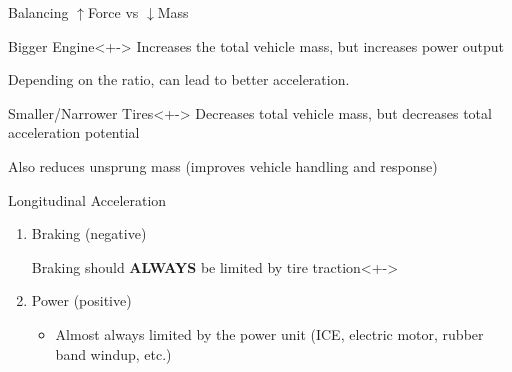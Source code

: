 \documentclass[aspectratio=169]{beamer}
\begin{document}
\begin{frame}{Balancing \(\uparrow\)Force vs \(\downarrow\)Mass}
    \onslide<+->{}
    \begin{exampleblock}{Bigger Engine}<+->
        Increases the total vehicle mass, but increases power output

        Depending on the ratio, can lead to better acceleration.
    \end{exampleblock}

    \vspace{10pt}
    \begin{exampleblock}{Smaller/Narrower Tires}<+->
        Decreases total vehicle mass, but decreases total acceleration potential

        Also reduces unsprung mass (improves vehicle handling and response)
    \end{exampleblock}
\end{frame}

\begin{frame}{Longitudinal Acceleration}

    \begin{enumerate}
        \item<+-> Braking (negative)
            \begin{alertblock}{Braking should \textbf{ALWAYS} be limited by tire traction}<+->
                \begin{itemize}
                \end{itemize}
            \end{alertblock}
        \item<+-> Power (positive)
        \begin{itemize}
            \item<+-> Almost always limited by the power unit (ICE, electric motor, rubber band windup, etc.)
        \end{itemize}
    \end{enumerate}
\end{frame}
\end{document}
